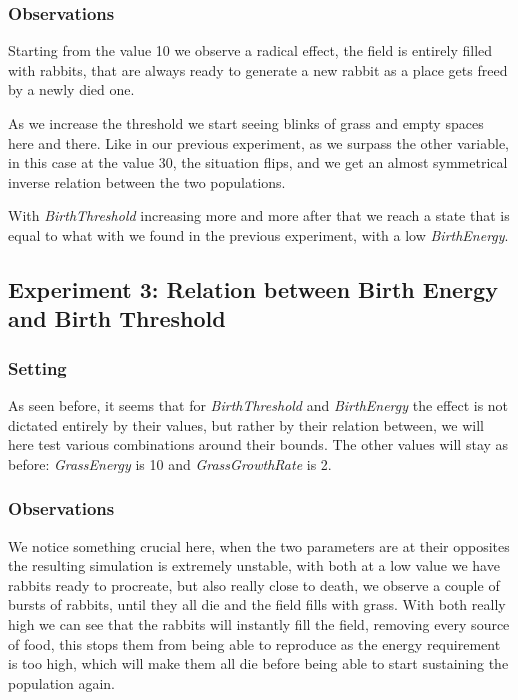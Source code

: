 \documentclass[11pt]{article}
\begin{document}
\subsubsection{Observations}
Starting  from the value 10 we observe a radical effect, the field is entirely filled with rabbits, that are always ready to generate a new rabbit as a place gets freed by a newly died one.

As we increase the threshold we start seeing blinks of grass  and empty spaces here and there.
Like in our previous experiment, as we surpass the other variable, in this case at the value 30, the situation flips, and we get an almost symmetrical inverse relation between the two populations.

With \textit{BirthThreshold} increasing more and more after that we reach a state that is equal to what with we found in the previous experiment, with a low \textit{BirthEnergy}.

\subsection{Experiment 3: Relation between Birth Energy and Birth Threshold}

\subsubsection{Setting}
As seen before, it seems that for \textit{BirthThreshold} and \textit{BirthEnergy} the effect is not dictated entirely by their values, but rather by their relation between, we will here test various combinations around their bounds.
The other values will stay as before: \textit{GrassEnergy} is 10 and \textit{GrassGrowthRate} is 2.

\subsubsection{Observations}
We notice something crucial here, when the two parameters are at their opposites the resulting simulation is extremely unstable, with both at a low value we have rabbits ready to procreate, but also really close to death, we observe a couple of bursts of rabbits, until they all die and the field fills with grass. With both really high we can see that the rabbits will instantly fill the field, removing every source of food, this stops them from being able to reproduce as the energy requirement is too high, which will make them all die before being able to start sustaining the population again.
\end{document}
